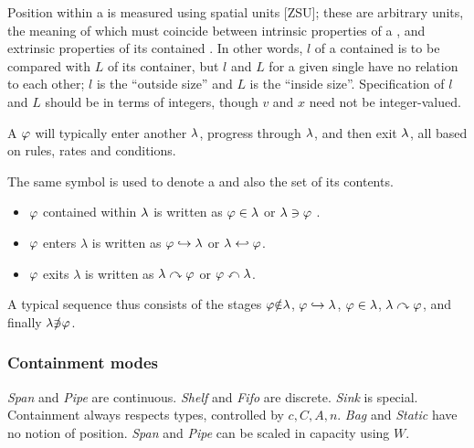 Position within a  is measured using  spatial
units [ZSU]; these are arbitrary units, the meaning of which must
coincide between intrinsic properties of a , and extrinsic
properties of its contained . In other words, $l$ of a
contained  is to be compared with $L$ of its container, but
$l$ and $L$ for a given single  have no relation to each
other; $l$ is the ``outside size'' and $L$ is the ``inside size''.
Specification of $l$ and $L$ should be in terms of integers, though
$v$ and $x$ need not be integer-valued.

A  ${\varphi}$ will typically enter another 
${\lambda}$, progress through ${\lambda}$, and then exit
${\lambda}$, all based on rules, rates and conditions.

The same symbol is used to denote a  and also the set of its contents.

\begin{itemize}
\item ${\varphi}$ contained within ${\lambda}$ is written as
  ${\varphi} \in{\lambda}$ or
  $ {\lambda} \ni{\varphi}$ .
\item ${\varphi}$ enters $\lambda$ is written as
  $ {\varphi} \hookrightarrow {\lambda}$ or
  $ {\lambda} \hookleftarrow {\varphi}$.
\item ${\varphi}$ exits $\lambda$ is written as
  ${\lambda} \curvearrowright {\varphi}$ or
  $ {\varphi} \curvearrowleft {\lambda}$.
\end{itemize}

A typical sequence thus consists of the stages ${\varphi} \slashed{\in}
{\lambda}$, ${\varphi} \hookrightarrow {\lambda}$,
${\varphi} \in{\lambda}$, ${\lambda} \curvearrowright
{\varphi}$, and finally ${\lambda} \slashed{\ni} {\varphi}$.

\subsubsection{Containment modes}

\emph{Span} and \emph{Pipe} are continuous. \emph{Shelf} and \emph{Fifo} are discrete.
\emph{Sink} is special. Containment always respects types, controlled by
$c,C,A,n$. \emph{Bag} and \emph{Static} have no notion of position.
\emph{Span} and \emph{Pipe} can be scaled in capacity using $W$.

